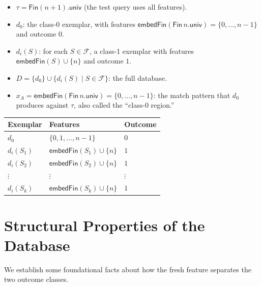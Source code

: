 \begin{definition}
  \label{def:database-components}
  \leanok
  \begin{itemize}
    \item $\tau = \mathsf{Fin}(n+1).\mathsf{univ}$ (the test query uses all features).
    \item $d_0$: the class-0 exemplar, with features
      $\mathsf{embedFin}(\mathsf{Fin}\,n.\mathsf{univ}) = \{0,\ldots,n-1\}$ and
      outcome $0$.
    \item $d_i(S)$: for each $S \in \mathcal{F}$, a class-1 exemplar with
      features $\mathsf{embedFin}(S) \cup \{n\}$ and outcome $1$.
    \item $D = \{d_0\} \cup \{d_i(S) \mid S \in \mathcal{F}\}$: the full database.
    \item $x_A = \mathsf{embedFin}(\mathsf{Fin}\,n.\mathsf{univ}) = \{0,\ldots,n-1\}$:
      the match pattern that $d_0$ produces against $\tau$, also called the
      ``class-0 region.''
  \end{itemize}

  \begin{center}
    \begin{tabular}{lll}
      \hline
      Exemplar & Features & Outcome \\
      \hline
      $d_0$ & $\{0, 1, \ldots, n-1\}$ & $0$ \\
      $d_i(S_1)$ & $\mathsf{embedFin}(S_1) \cup \{n\}$ & $1$ \\
      $d_i(S_2)$ & $\mathsf{embedFin}(S_2) \cup \{n\}$ & $1$ \\
      $\vdots$ & $\vdots$ & $\vdots$ \\
      $d_i(S_k)$ & $\mathsf{embedFin}(S_k) \cup \{n\}$ & $1$ \\
      \hline
    \end{tabular}
  \end{center}
\end{definition}

\section{Structural Properties of the Database}

We establish some foundational facts about how the fresh feature separates the
two outcome classes.

